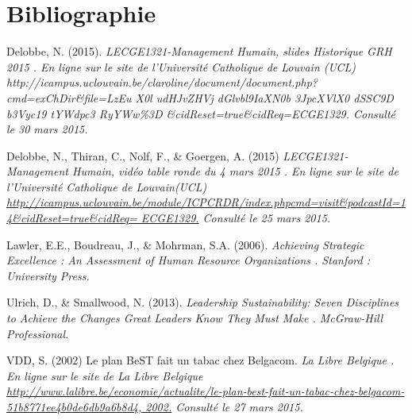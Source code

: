 \pagebreak
\section*{Bibliographie}

Delobbe, N. (2015). \it LECGE1321-Management Humain, slides Historique GRH 2015 \normalfont. En ligne sur le site de l’Université Catholique de Louvain (UCL) http://icampus.uclouvain.be/claroline/document/document.php?cmd=exChDir\&file=LzEu X0l udHJvZHVj dGlvbl9IaXN0b 3JpcXVlX0 dSSC9D b3Vyc19 tYWdpc3 RyYWw\%3D \&cidReset=true\&cidReq=ECGE1329. Consulté le 30 mars 2015. \newline

Delobbe, N., Thiran, C., Nolf, F., \& Goergen, A. (2015) \it LECGE1321-Management Humain, vidéo table ronde du 4 mars 2015 \normalfont. En ligne sur le site de l’Université Catholique de Louvain(UCL) \url{http://icampus.uclouvain.be/module/ICPCRDR/index.phpcmd=visit\&podcastId=14\&cidReset=true\&cidReq= ECGE1329.} Consulté le 25 mars 2015. \newline


Lawler, E.E., Boudreau, J., \& Mohrman, S.A. (2006). \it Achieving Strategic Excellence : An Assessment of Human Resource Organizations \normalfont. Stanford : University Press.\newline 

Ulrich, D., \& Smallwood, N. (2013). \it Leadership Sustainability: Seven Disciplines to Achieve the Changes Great Leaders Know They Must Make \normalfont. McGraw-Hill Professional.\newline 

VDD, S. (2002) Le plan BeST fait un tabac chez Belgacom. \it La Libre Belgique \normalfont. En ligne sur le site de La Libre Belgique \url{http://www.lalibre.be/economie/actualite/le-plan-best-fait-un-tabac-chez-belgacom-51b8771ee4b0de6db9a6b8d4, 2002.} Consulté le 27 mars 2015. 
